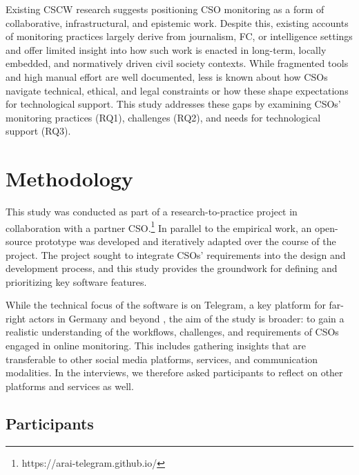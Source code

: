 \documentclass[acmsmall]{acmart}
\begin{document}
Existing CSCW research suggests positioning CSO monitoring as a form of collaborative, infrastructural, and epistemic work. Despite this, existing accounts of monitoring practices largely derive from journalism, FC, or intelligence settings and offer limited insight into how such work is enacted in long-term, locally embedded, and normatively driven civil society contexts. While fragmented tools and high manual effort are well documented, less is known about how CSOs navigate technical, ethical, and legal constraints or how these shape expectations for technological support. This study addresses these gaps by examining CSOs' monitoring practices (RQ1), challenges (RQ2), and needs for technological support (RQ3).


\section{Methodology}
\label{sec:methods}
This study was conducted as part of a research-to-practice project in collaboration with a partner CSO.\footnote{https://arai-telegram.github.io/} In parallel to the empirical work, an open-source prototype was developed and iteratively adapted over the course of the project. The project sought to integrate CSOs' requirements into the design and development process, and this study provides the groundwork for defining and prioritizing key software features.

While the technical focus of the software is on Telegram, a key platform for far-right actors in Germany and beyond \cite{baumgartner_pushshift_2020,urman_what_2022}, the aim of the study is broader: to gain a realistic understanding of the workflows, challenges, and requirements of CSOs engaged in online monitoring. This includes gathering insights that are transferable to other social media platforms, services, and communication modalities. In the interviews, we therefore asked participants to reflect on other platforms and services as well. 


\subsection{Participants}
\end{document}
